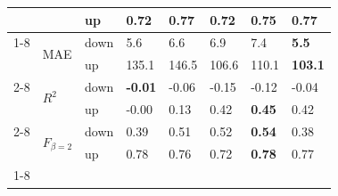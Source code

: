 \begin{table}
\begin{tabular}{llllllll}
 &  & up & 0.72 & 0.77 & 0.72 & 0.75 & \textbf{0.77} \\
\cline{1-8} \cline{2-8}
\multirow[t]{6}{*}{TransnetBW} & \multirow[t]{2}{*}{MAE} & down & 5.6 & 6.6 & 6.9 & 7.4 & \textbf{5.5} \\
 &  & up & 135.1 & 146.5 & 106.6 & 110.1 & \textbf{103.1} \\
\cline{2-8}
 & \multirow[t]{2}{*}{$R^2$} & down & \textbf{-0.01} & -0.06 & -0.15 & -0.12 & -0.04 \\
 &  & up & -0.00 & 0.13 & 0.42 & \textbf{0.45} & 0.42 \\
\cline{2-8}
 & \multirow[t]{2}{*}{$F_{\beta=2}$} & down & 0.39 & 0.51 & 0.52 & \textbf{0.54} & 0.38 \\
 &  & up & 0.78 & 0.76 & 0.72 & \textbf{0.78} & 0.77 \\
\cline{1-8} \cline{2-8}
\bottomrule
\end{tabular}
\end{table}
